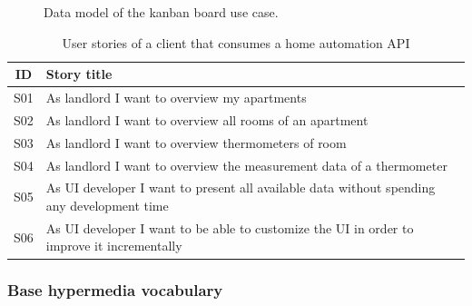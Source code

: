 \begin{figure}[!htb]
  \caption{Data model of the kanban board use case.}
\end{figure}

\begin{table}
  \begin{center}
    \begin{tabular}{ |c|l| }
      \hline
      ID & Story title \\
      \hline
      S01 & As landlord I want to overview my apartments \\
      S02 & As landlord I want to overview all rooms of an apartment \\
      S03 & As landlord I want to overview thermometers of room \\
      S04 & As landlord I want to overview the measurement data of a thermometer \\
      S05 & As UI developer I want to present all available data without spending any development time \\
      S06 & As UI developer I want to be able to customize the UI in order to improve it incrementally \\
      \hline
    \end{tabular}
    \caption{User stories of a client that consumes a home automation API}
  \end{center}
\end{table}

\subsubsection{Base hypermedia vocabulary}\label{basevocab}

